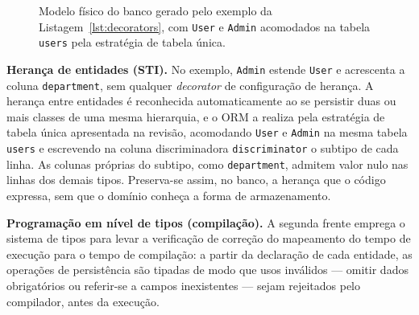 \begin{figure}[ht]
  \centering
  \caption{Modelo físico do banco gerado pelo exemplo da Listagem~\ref{lst:decorators}, com \texttt{User} e \texttt{Admin} acomodados na tabela \texttt{users} pela estratégia de tabela única.}
  \label{fig:modelo-fisico}
\end{figure}

\textbf{Herança de entidades (STI).} No exemplo, \texttt{Admin} estende \texttt{User} e acrescenta a coluna \texttt{department}, sem qualquer \emph{decorator} de configuração de herança. A herança entre entidades é reconhecida automaticamente ao se persistir duas ou mais classes de uma mesma hierarquia, e o ORM a realiza pela estratégia de tabela única apresentada na revisão, acomodando \texttt{User} e \texttt{Admin} na mesma tabela \texttt{users} e escrevendo na coluna discriminadora \texttt{discriminator} o subtipo de cada linha. As colunas próprias do subtipo, como \texttt{department}, admitem valor nulo nas linhas dos demais tipos. Preserva-se assim, no banco, a herança que o código expressa, sem que o domínio conheça a forma de armazenamento.

\textbf{Programação em nível de tipos (compilação).} A segunda frente emprega o sistema de tipos para levar a verificação de correção do mapeamento do tempo de execução para o tempo de compilação: a partir da declaração de cada entidade, as operações de persistência são tipadas de modo que usos inválidos --- omitir dados obrigatórios ou referir-se a campos inexistentes --- sejam rejeitados pelo compilador, antes da execução.

